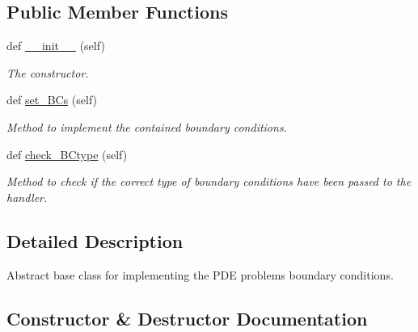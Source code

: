 \subsection*{Public Member Functions}
\begin{DoxyCompactItemize}
\item 
def \hyperlink{classMain__PDE__Repo_1_1src_1_1BCHandler_1_1BCHandler_a68e629dcc910ca7fe424c89ddc9d4bbe}{\+\_\+\+\_\+init\+\_\+\+\_\+} (self)
\begin{DoxyCompactList}\small\item\em The constructor. \end{DoxyCompactList}\item 
def \hyperlink{classMain__PDE__Repo_1_1src_1_1BCHandler_1_1BCHandler_a4c40f8d45a90728df43e5f583a4348de}{set\+\_\+\+B\+Cs} (self)
\begin{DoxyCompactList}\small\item\em Method to implement the contained boundary conditions. \end{DoxyCompactList}\item 
def \hyperlink{classMain__PDE__Repo_1_1src_1_1BCHandler_1_1BCHandler_aa13bfef653445fbbbec183c7e3b6277a}{check\+\_\+\+B\+Ctype} (self)
\begin{DoxyCompactList}\small\item\em Method to check if the correct type of boundary conditions have been passed to the handler. \end{DoxyCompactList}\end{DoxyCompactItemize}


\subsection{Detailed Description}
Abstract base class for implementing the P\+DE problem\textquotesingle{}s boundary conditions. 



\subsection{Constructor \& Destructor Documentation}
\mbox{\label{classMain__PDE__Repo_1_1src_1_1BCHandler_1_1BCHandler_a68e629dcc910ca7fe424c89ddc9d4bbe}} 
